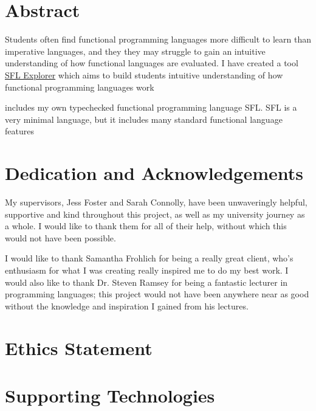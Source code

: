 \chapter*{Abstract}
Students often find functional programming languages more difficult to learn than imperative languages, and they they may struggle to gain an intuitive understanding of how functional languages are evaluated. I have created a tool \href{https://functional.kiransturt.co.uk}{SFL Explorer} which aims to build students intuitive understanding of how functional programming languages work

includes my own typechecked functional programming language SFL. SFL is a very minimal language, but it includes many standard functional language features



\chapter*{Dedication and Acknowledgements}
My supervisors, Jess Foster and Sarah Connolly, have been unwaveringly helpful, supportive and kind throughout this project, as well as my university journey as a whole. I would like to thank them for all of their help, without which this would not have been possible. 

I would like to thank Samantha Frohlich for being a really great client, who's enthusiasm for what I was creating really inspired me to do my best work. I would also like to thank Dr. Steven Ramsey for being a fantastic lecturer in programming languages; this project would not have been anywhere near as good without the knowledge and inspiration I gained from his lectures. 

\makedecl
\makeaidecl
\tableofcontents


\chapter*{Ethics Statement}


\chapter*{Supporting Technologies}
\label{chap:supporting_tech}

